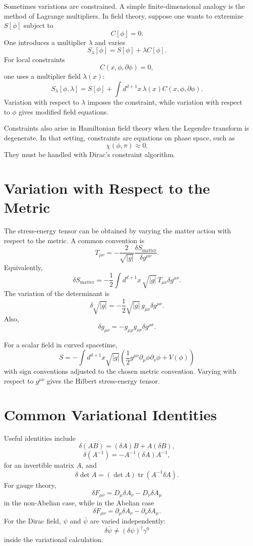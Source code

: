 Sometimes variations are constrained. A simple finite-dimensional analogy is the
method of Lagrange multipliers. In field theory, suppose one wants to extremize
\(S[\phi]\) subject to
\[
    C[\phi]=0.
\]
One introduces a multiplier \(\lambda\) and varies
\[
    S_\lambda[\phi]=S[\phi]+\lambda C[\phi].
\]
For local constraints
\[
    C(x,\phi,\partial\phi)=0,
\]
one uses a multiplier field \(\lambda(x)\):
\[
    S_\lambda[\phi,\lambda]
    =S[\phi]+\int d^{d+1}x\,\lambda(x)C(x,\phi,\partial\phi).
\]
Variation with respect to \(\lambda\) imposes the constraint, while variation
with respect to \(\phi\) gives modified field equations.

Constraints also arise in Hamiltonian field theory when the Legendre transform
is degenerate. In that setting, constraints are equations on phase space, such
as
\[
    \chi(\phi,\pi)\approx0.
\]
They must be handled with Dirac's constraint algorithm.

\section{Variation with Respect to the Metric}

The stress-energy tensor can be obtained by varying the matter action with
respect to the metric. A common convention is
\[
    T_{\mu\nu}=-\frac{2}{\sqrt{|g|}}\frac{\delta S_{\mathrm{matter}}}{\delta g^{\mu\nu}}.
\]
Equivalently,
\[
    \delta S_{\mathrm{matter}}
    =-\frac{1}{2}\int d^{d+1}x\,\sqrt{|g|}\,T_{\mu\nu}\delta g^{\mu\nu}.
\]
The variation of the determinant is
\[
    \delta\sqrt{|g|}=-\frac{1}{2}\sqrt{|g|}\,g_{\mu\nu}\delta g^{\mu\nu}.
\]
Also,
\[
    \delta g_{\mu\nu}=-g_{\mu\rho}g_{\nu\sigma}\delta g^{\rho\sigma}.
\]

For a scalar field in curved spacetime,
\[
    S=-\int d^{d+1}x\sqrt{|g|}\left(
        \frac{1}{2}g^{\mu\nu}\partial_\mu\phi\partial_\nu\phi+V(\phi)
    \right)
\]
with sign conventions adjusted to the chosen metric convention. Varying with
respect to \(g^{\mu\nu}\) gives the Hilbert stress-energy tensor.

\section{Common Variational Identities}

Useful identities include
\[
    \delta(AB)=(\delta A)B+A(\delta B),
\]
\[
    \delta(A^{-1})=-A^{-1}(\delta A)A^{-1},
\]
for an invertible matrix \(A\), and
\[
    \delta\det A=(\det A)\operatorname{tr}(A^{-1}\delta A).
\]
For gauge theory,
\[
    \delta F_{\mu\nu}=D_\mu\delta A_\nu-D_\nu\delta A_\mu
\]
in the non-Abelian case, while in the Abelian case
\[
    \delta F_{\mu\nu}=\partial_\mu\delta A_\nu-\partial_\nu\delta A_\mu.
\]
For the Dirac field,
\(\psi\) and \(\bar\psi\) are varied independently:
\[
    \delta\bar\psi\neq (\delta\psi)^\dagger\gamma^0
\]
inside the variational calculation.


